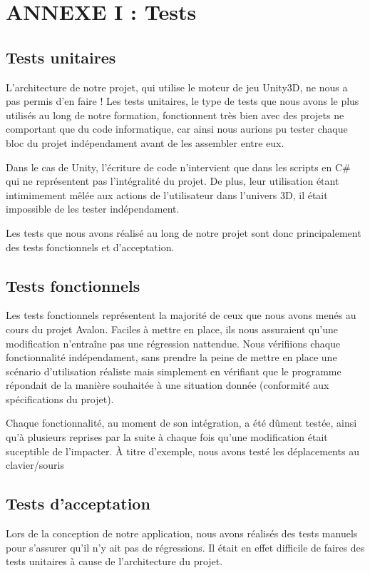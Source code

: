 \section{ANNEXE I : Tests}

\subsection{Tests unitaires}
L'architecture de notre projet, qui utilise le moteur de jeu Unity3D, ne nous a pas permis d'en faire ! \newline
Les tests unitaires, le type de tests que nous avons le plus utilisés au long de notre formation, fonctionnent très bien avec des projets ne comportant que du code informatique, car ainsi nous aurions pu tester chaque bloc du projet indépendament avant de les assembler entre eux. \newline

Dans le cas de Unity, l'écriture de code n'intervient que dans les scripts en C\# qui ne représentent pas l'intégralité du projet. De plus, leur utilisation étant intimimement mêlée aux actions de l'utilisateur dans l'univers 3D, il était impossible de les tester indépendament. \newline

Les tests que nous avons réalisé au long de notre projet sont donc principalement des tests fonctionnels et d'acceptation. 

\subsection{Tests fonctionnels}

Les tests fonctionnels représentent la majorité de ceux que nous avons menés au cours du projet Avalon. Faciles à mettre en place, ils nous assuraient qu'une modification n'entraîne pas une régression nattendue. Nous vérifiions chaque fonctionnalité indépendament, sans prendre la peine de mettre en place une scénario d'utilisation réaliste mais simplement en vérifiant que le programme répondait de la manière souhaitée à une situation donnée (conformité aux spécifications du projet).\newline

Chaque fonctionnalité, au moment de son intégration, a été dûment testée, ainsi qu'à plusieurs reprises par la suite à chaque fois qu'une modification était suceptible de l'impacter. À titre d'exemple, nous avons testé les déplacements au clavier/souris

\subsection{Tests d'acceptation}
Lors de la conception de notre application, nous avons réalisés des tests manuels pour s'assurer qu'il n'y ait pas de régressions.
Il était en effet difficile de faires des tests unitaires à cause de l'architecture du projet.